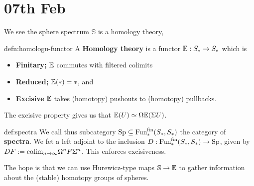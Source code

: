\newpage 
\section{07th Feb}

We see the sphere spectrum $\mathbb{S}$ is a homology theory, 

\begin{definition}[Homology]{defn:homologu-functor}
A \textbf{Homology theory} is a functor $\mathbb{E} : S_\ast \to S_\ast$ which is
\begin{itemize}
	\item{\textbf{Finitary;} $\mathbb{E}$ commutes with filtered colimits}
	\item{\textbf{Reduced;} $\mathbb{E}(\ast) = \ast$, and}
	\item{\textbf{Excisive} $\mathbb{E}$ takes (homotopy) pushouts to (homotopy) pullbacks.}
\end{itemize}
\end{definition}
The excisive property gives us that $\mathbb{E}(U) \simeq \Omega \mathbb{E}(\Sigma U)$.

\begin{theorem}[Spectra]{def:spectra}
	We call  thus subcategory $\text{Sp} \subseteq \text{Fun}_\ast^\text{fin}(S_\ast,S_\ast)$ the category of \textbf{spectra}. We fet a left adjoint to the inclusion $D : \text{Fun}_\ast^\text{fin}(S_\ast,S_\ast) \to \text{Sp}$, given by $DF := \text{colim}_{n\to\infty} \Omega^n F \Sigma^n$. This enforces excisiveness.
\end{theorem}

The hope is that we can use Hurewicz-type maps $\mathbb{S} \to \mathbb{E}$ to gather information about the (stable) homotopy groups of spheres. 



